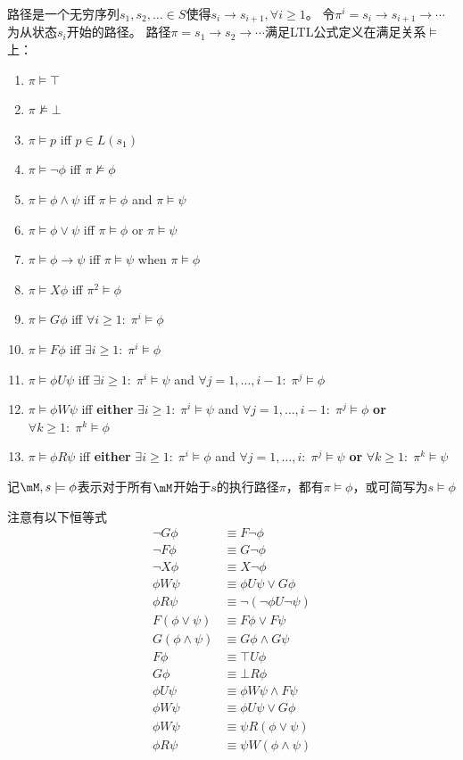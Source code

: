 \begin{definition}[路径(path)]
路径是一个无穷序列$s_1,s_2,\ldots\in S$使得$s_i\to s_{i+1},\forall i\geq 1$。
令$\pi^i=s_i\to s_{i+1}\to\cdots$为从状态$s_i$开始的路径。
路径$\pi=s_1\to s_2\to\cdots$满足LTL公式定义在满足关系$\models$上：
\begin{enumerate}
	\item $\pi\models\top$
	\item $\pi\not\models\bot$
	\item $\pi\models p$ iff $p\in L(s_1)$
	\item $\pi\models\lnot\phi$ iff $\pi\not\models\phi$
	\item $\pi\models\phi\land\psi$ iff $\pi\models\phi$ and $\pi\models\psi$
	\item $\pi\models\phi\lor\psi$ iff $\pi\models\phi$ or $\pi\models\psi$
	\item $\pi\models\phi\to\psi$ iff $\pi\models\psi$ when $\pi\models\phi$
	\item $\pi\models X\phi$ iff $\pi^2\models\phi$
	\item $\pi\models G\phi$ iff $\forall i\geq 1:\;\pi^i\models\phi$
	\item $\pi\models F\phi$ iff $\exists i\geq 1:\;\pi^i\models\phi$
	\item $\pi\models \phi U\psi$ iff $\exists i\geq 1:\;\pi^i\models\psi$ and $\forall j=1,\ldots,i-1:\;\pi^j\models\phi$
	\item $\pi\models \phi W\psi$ iff \textbf{either} $\exists i\geq 1:\;\pi^i\models\psi$ and $\forall j=1,\ldots,i-1:\;\pi^j\models\phi$ \textbf{or} $\forall k\geq 1:\;\pi^k\models\phi$
	\item $\pi\models \phi R\psi$ iff \textbf{either} $\exists i\geq 1:\;\pi^i\models\phi$ and $\forall j=1,\ldots,i:\;\pi^j\models\psi$ \textbf{or} $\forall k\geq 1:\;\pi^k\models\psi$
\end{enumerate}
记$\mM,s\models\phi$表示对于所有$\mM$开始于$s$的执行路径$\pi$，都有$\pi\models\phi$，或可简写为$s\models\phi$
\end{definition}
注意有以下恒等式
\[\begin{aligned}
\lnot G\phi&\equiv F\lnot\phi\\
\lnot F\phi&\equiv G\lnot\phi\\
\lnot X\phi&\equiv X\lnot\phi\\
\phi W\psi&\equiv \phi U\psi\lor G\phi\\
\phi R\psi&\equiv \lnot(\lnot\phi U\lnot\psi)\\
F(\phi\lor\psi)&\equiv F\phi\lor F\psi\\
G(\phi\land\psi)&\equiv G\phi\land G\psi\\
F\phi&\equiv\top U\phi\\
G\phi&\equiv\bot R\phi\\
\phi U\psi&\equiv\phi W\psi\land F\psi\\
\phi W\psi&\equiv\phi U\psi\lor G\phi\\
\phi W\psi&\equiv\psi R(\phi\lor\psi)\\
\phi R\psi&\equiv\psi W(\phi\land\psi)
\end{aligned}\]
